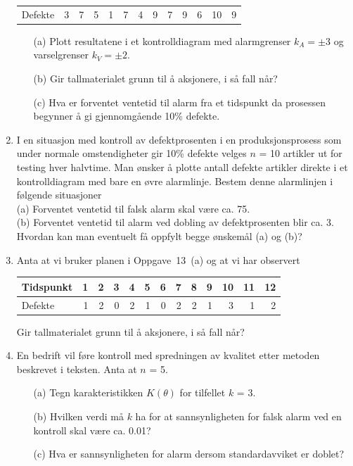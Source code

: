 \begin{enumerate}
\begin{center}
\begin{tabular}{l|rrrrrrrrrrrr}
Defekte      & 3 & 7 & 5 & 1 & 7 & 4 & 9 & 7 & 9 &  6 & 10 &  9
\end{tabular}
\end{center}
\begin{itemize}
\item[(a)] Plott resultatene i et kontrolldiagram med alarmgrenser
 $k_A = \pm 3$ og varselgrenser $k_V = \pm 2$. 
\item[(b)] Gir tallmaterialet grunn til å aksjonere, i så fall når? 
\item[(c)] Hva er forventet ventetid til alarm fra et tidspunkt da prosessen 
    be\-gyn\-ner å gi gjennomgående 10\% defekte.
\end{itemize}
\item
I en situasjon med kontroll av defektprosenten i en produksjonsprosess
som under normale omstendigheter gir 10\% defekte velges $n$ = 10
artikler ut for testing hver halvtime.  Man ønsker å plotte antall
defekte artikler direkte i et kontrolldiagram med bare en øvre alarmlinje.
Bestem denne alarmlinjen i følgende situasjoner \\
(a) Forventet ventetid til falsk alarm skal være ca. 75. \\
(b) Forventet ventetid til alarm ved dobling av defektprosenten blir
     ca. 3. \\
Hvordan kan man eventuelt få oppfylt begge ønskemål (a) og (b)?
\item 
Anta at vi bruker planen i Oppgave~13~(a) og at vi har observert
\begin{center}
\begin{tabular}{l|rrrrrrrrrrrr}
Tidspunkt    &   1 & 2 & 3 & 4 & 5 & 6 & 7 & 8 & 9 & 10 & 11 & 12 \\ \hline
Defekte      &   1 & 2 & 0 & 2 & 1 & 0 & 2 & 2 & 1 &  3 &  1 &  2
\end{tabular}
\end{center}
Gir tallmaterialet grunn til å aksjonere, i så fall når?
\item
En bedrift vil føre kontroll med spredningen av kvalitet etter 
metoden beskrevet i teksten.  Anta at $n$ = 5.
\begin{itemize}
\item[(a)] Tegn karakteristikken $K(\theta)$ for tilfellet $k$ = 3.
\item[(b)] Hvilken verdi må $k$ ha for at sannsynligheten for falsk alarm 
    ved en kontroll skal være ca. 0.01? 
\item[(c)] Hva er sannsynligheten for alarm dersom standardavviket er doblet?
\end{itemize}

\end{enumerate}

